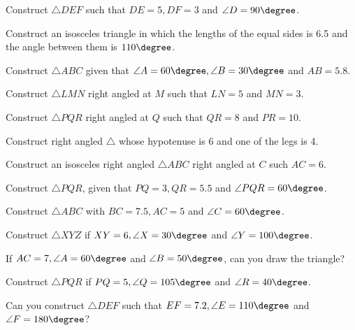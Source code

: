 \item Construct $\triangle DEF$ such that $DE = 5, DF = 3$ and $\angle D = 90\degree$.
\\
\solution


\item Construct an isosceles triangle in which the lengths of the equal sides is 6.5 and the angle between them is $110\degree$.
\\
\solution

\item Construct $\triangle ABC$ given that $\angle A = 60\degree, \angle B = 30\degree$ and $AB = 5.8$.
\\
\solution

\item Construct  $\triangle LMN$ right angled at $M$ such that $LN = 5$ and $MN = 3$.
 \\
 \solution

\item Construct  $\triangle PQR$ right angled at $Q$ such that $QR = 8$ and $PR = 10$.
\\
\solution

\item Construct  right angled $\triangle $ whose hypotenuse  is 6 and one of the legs is 4.
\\
\solution


\item Construct  an isosceles right angled $\triangle ABC$ right angled at $C$ such $AC = 6$.
\\
\solution


\item Construct $\triangle PQR$, given that $PQ = 3, QR = 5.5$ and $\angle PQR = 60 \degree$.
\\
\solution

%
\item Construct $\triangle ABC$  with $BC = 7.5, AC = 5$ and $\angle C = 60\degree$.
\\
\solution

\item Construct $\triangle XYZ$ if $XY = 6, \angle X = 30\degree$ and $\angle Y = 100 \degree$.
\\
\solution


\item If $AC = 7, \angle A = 60\degree$ and $\angle B = 50 \degree$, can you draw the triangle?
%
\\
\solution


\item Construct $\triangle PQR$ if $PQ = 5, \angle Q = 105 \degree$ and $\angle R = 40 \degree$.
\\

\item Can you construct $\triangle DEF$ such that $EF = 7.2, \angle E = 110\degree$ and $\angle F = 180\degree$?




